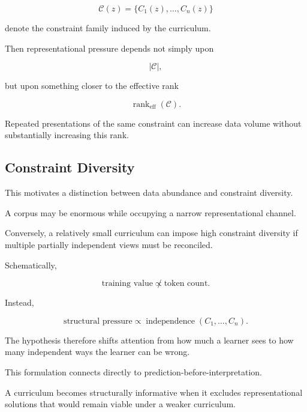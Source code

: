 \documentclass[11pt]{article}
\theoremstyle{remark}
\begin{document}
\begin{equation}
\mathcal{C}(z)
=
\{C_1(z),\ldots,C_n(z)\}
\end{equation}

denote the constraint family induced by the curriculum.

Then representational pressure depends not simply upon

\begin{equation}
|\mathcal{C}|,
\end{equation}

but upon something closer to the effective rank

\begin{equation}
\operatorname{rank}_{\mathrm{eff}}(\mathcal{C}).
\end{equation}

Repeated presentations of the same constraint can increase data volume without substantially increasing this rank.

\subsection{Constraint Diversity}

This motivates a distinction between data abundance and constraint diversity.

A corpus may be enormous while occupying a narrow representational channel.

Conversely, a relatively small curriculum can impose high constraint diversity if multiple partially independent views must be reconciled.

Schematically,

\begin{equation}
\text{training value}
\not\propto
\text{token count}.
\end{equation}

Instead,

\begin{equation}
\text{structural pressure}
\propto
\operatorname{independence}
(
C_1,\ldots,C_n
).
\end{equation}

The hypothesis therefore shifts attention from how much a learner sees to how many independent ways the learner can be wrong.

This formulation connects directly to prediction-before-interpretation.

A curriculum becomes structurally informative when it excludes representational solutions that would remain viable under a weaker curriculum.
\end{document}
